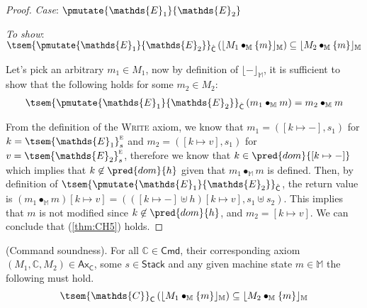 {\begin{proof}
\textit{Case}: $\pmutate{\mathds{E}_1}{\mathds{E}_2}$

\textit{To show}: $\tsem{\pmutate{\mathds{E}_1}{\mathds{E}_2}}_{\hat{\mathsf{C}}} \left( \lfloor M_1 \bullet_\mathbb{M} \{m\} \rfloor_\mathbb{M} \right) \subseteq \lfloor M_2 \bullet_\mathbb{M} \{m\} \rfloor_\mathbb{M}$

Let's pick an arbitrary $m_1 \in M_1$, now by definition of $\lfloor - \rfloor_\mathbb{M}$, it is sufficient to show that the following holds for some $m_2 \in M_2$:
\begin{gather}
	\label{thm:CH5} \tsem{\pmutate{\mathds{E}_1}{\mathds{E}_2}}_{\hat{\mathsf{C}}} \left( m_1 \bullet_\mathbb{M} m \right) = m_2 \bullet_\mathbb{M} m
\end{gather}

From the definition of the \textsc{Write} axiom, we know that $m_1 = ([k \mapsto -], s_1)$ for $k = \tsem{\mathds{E}_1}_s^\textsc{e}$ and $m_2 = ([k \mapsto v], s_1)$ for $v = \tsem{\mathds{E}_2}_s^\textsc{e}$, therefore we know that $k \in \pred{dom}{[k \mapsto -]}$ which implies that $k \not\in \pred{dom}{h}$ given that $m_1 \bullet_\mathbb{M} m$ is defined. Then, by definition of $\tsem{\pmutate{\mathds{E}_1}{\mathds{E}_2}}_{\hat{\mathsf{C}}}$, the return value is $(m_1 \bullet_\mathbb{M} m)[k \mapsto v] = (([k \mapsto -] \uplus h)[k \mapsto v], s_1 \uplus s_2)$. This implies that $m$ is not modified since $k \not\in \pred{dom}{h}$, and $m_2 = [k \mapsto v]$. We can conclude that (\ref{thm:CH5}) holds.
\end{proof}
}

\thm \label{thm:cSound} (Command soundness). For all $\mathds{C} \in \mathsf{Cmd}$, their corresponding axiom $(M_1, \mathds{C}, M_2) \in \mathsf{Ax}_\mathsf{C}$, some $s \in \mathsf{Stack}$ and any given machine state $m \in \mathbb{M}$ the following must hold.
\[
	\tsem{\mathds{C}}_\mathsf{C} \left( \lfloor M_1 \bullet_\mathbb{M} \{m\} \rfloor_\mathbb{M} \right) \subseteq \lfloor M_2 \bullet_\mathbb{M} \{m\} \rfloor_\mathbb{M}
\]

